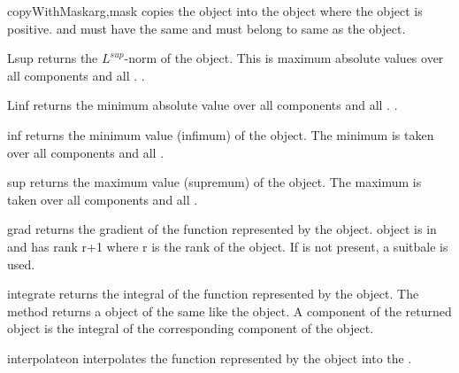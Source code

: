 \begin{methoddesc}[Data]{copyWithMask}{arg,mask}
copies the \Data object  into the object 
where the \Data object  is positive. 
and  must have the same \Shape 
and must belong to same \FunctionSpace as
the object.
\end{methoddesc}

\begin{methoddesc}[Data]{Lsup}{}
returns the $L^{sup}$-norm of the object. This is maximum absolute values over all components and all \DataSamplePoints. .
\end{methoddesc}
\begin{methoddesc}[Data]{Linf}{}
returns the minimum absolute value over all components and all \DataSamplePoints. .
\end{methoddesc}
\begin{methoddesc}[Data]{inf}{}
returns the minimum value (infimum) of the object. The minimum is
taken over all components and all \DataSamplePoints .  
\end{methoddesc}

\begin{methoddesc}[Data]{sup}{}
returns the maximum value (supremum) of the object. The maximum is
taken over all components and all \DataSamplePoints .  
\end{methoddesc}

\begin{methoddesc}[Data]{grad}{}
returns the gradient of the function represented by the object.
\Data object is in \FunctionSpace {} and has rank r+1 where r is the rank of the object.
If  is not present, a suitbale \FunctionSpace is used. 
\end{methoddesc}

\begin{methoddesc}[Data]{integrate}{}
returns the integral of the function represented by the object. The method returns
a  object of the same \Shape like the object.  A
component of the returned object is the integral of the corresponding
component of the object. 
\end{methoddesc}

\begin{methoddesc}[Data]{interpolate}{on}
interpolates 
the function represented by the object
into the \FunctionSpace{}.
\end{methoddesc}

